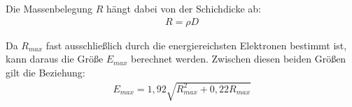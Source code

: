 Die Massenbelegung $R$ hängt dabei von der Schichdicke ab:
\begin{align}
  R =\rho D
\end{align}

Da $R_{max}$ fast ausschließlich durch die energiereichsten Elektronen bestimmt ist, kann daraus die Größe $E_{max}$ berechnet werden.
Zwischen diesen beiden Größen gilt die Beziehung:
\begin{align}
  E_{max} = 1,92 \sqrt{R_{max}^2 + 0,22 R_{max}}
\end{align}
